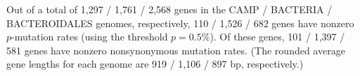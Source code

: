 Out of a total of 1,297 / 1,761 / 2,568 genes in the CAMP / BACTERIA / BACTEROIDALES genomes, respectively, 110 / 1,526 / 682 genes have nonzero $p$-mutation rates (using the threshold $p=0.5\%$). Of these genes, 101 / 1,397 / 581 genes have nonzero nonsynonymous mutation rates. (The rounded average gene lengths for each genome are 919 / 1,106 / 897 bp, respectively.)\endinput